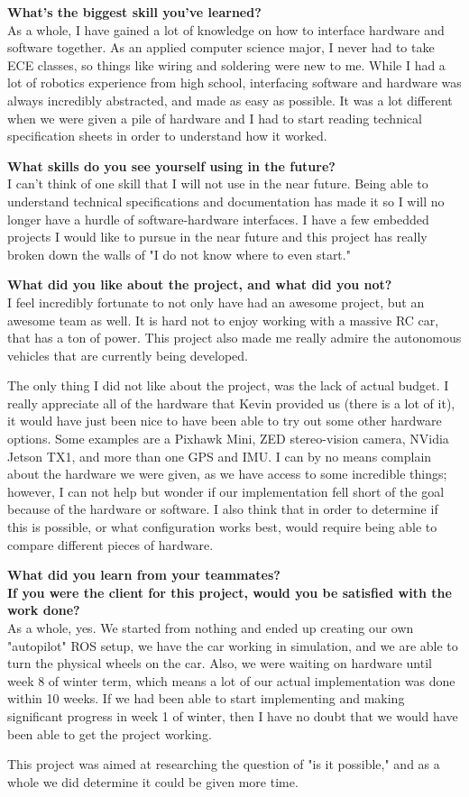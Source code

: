 \documentclass[compsoc,draftclsnofoot,onecolumn,10pt]{IEEEtran}
\begin{document}
\textbf{What's the biggest skill you've learned?}\\
As a whole, I have gained a lot of knowledge on how to interface hardware and software together. As an applied computer science major, I never had to take ECE classes, so things like wiring and soldering were new to me. While I had a lot of robotics experience from high school, interfacing software and hardware was always incredibly abstracted, and made as easy as possible. It was a lot different when we were given a pile of hardware and I had to start reading technical specification sheets in order to understand how it worked.

\textbf{What skills do you see yourself using in the future?}\\
I can't think of one skill that I will not use in the near future. Being able to understand technical specifications and documentation has made it so I will no longer have a hurdle of software-hardware interfaces. I have a few embedded projects I would like to pursue in the near future and this project has really broken down the walls of "I do not know where to even start."

\textbf{What did you like about the project, and what did you not?}\\
I feel incredibly fortunate to not only have had an awesome project, but an awesome team as well. It is hard not to enjoy working with a massive RC car, that has a ton of power. This project also made me really admire the autonomous vehicles that are currently being developed. \par
The only thing I did not like about the project, was the lack of actual budget. I really appreciate all of the hardware that Kevin provided us (there is a lot of it), it would have just been nice to have been able to try out some other hardware options. Some examples are a Pixhawk Mini, ZED stereo-vision camera, NVidia Jetson TX1, and more than one GPS and IMU. I can by no means complain about the hardware we were given, as we have access to some incredible things; however, I can not help but wonder if our implementation fell short of the goal because of the hardware or software. I also think that in order to determine if this is possible, or what configuration works best, would require being able to compare different pieces of hardware.

\textbf{What did you learn from your teammates?}\\


\textbf{If you were the client for this project, would you be satisfied with the work done?}\\
As a whole, yes. We started from nothing and ended up creating our own "autopilot" ROS setup, we have the car working in simulation, and we are able to turn the physical wheels on the car. Also, we were waiting on hardware until week 8 of winter term, which means a lot of our actual implementation was done within 10 weeks. If we had been able to start implementing and making significant progress in week 1 of winter, then I have no doubt that we would have been able to get the project working. \par
This project was aimed at researching the question of "is it possible," and as a whole we did determine it could be given more time.
\end{document}
